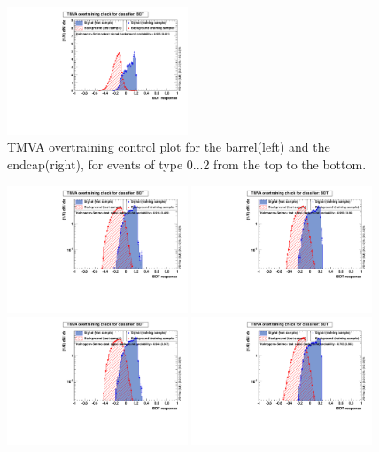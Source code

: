 \begin{figure}
                \includegraphics[width=0.48\textwidth]{Figures/bdt/overtrain_BDT_endcaps_2}
        \caption{TMVA overtraining control plot for the barrel(left) and the endcap(right), for events of type 0...2 from the top to the bottom. }
        \label{fig:overtrain_BDT_controlPlots_log}
\end{figure}
\begin{figure}
        \centering
                \includegraphics[width=0.48\textwidth]{Figures/bdt/overtrain_BDT_barrel_0_log}
                \includegraphics[width=0.48\textwidth]{Figures/bdt/overtrain_BDT_endcaps_0_log}
                \includegraphics[width=0.48\textwidth]{Figures/bdt/overtrain_BDT_barrel_1_log}
                \includegraphics[width=0.48\textwidth]{Figures/bdt/overtrain_BDT_endcaps_1_log}

\end{figure}
